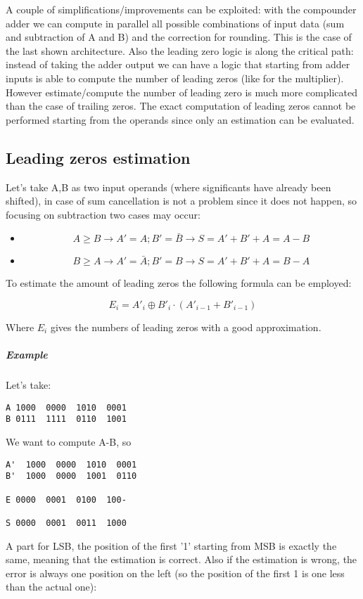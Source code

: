 A couple of simplifications/improvements can be exploited: with the compounder
adder we can compute in parallel all possible combinations of input data (sum
and subtraction of A and B) and the correction for rounding. This is the case
of the last shown architecture. Also the leading zero logic is along the
critical path: instead of taking the adder output we can have a logic that
starting from adder inputs is able to compute the number of leading zeros (like
for the multiplier). However estimate/compute the number of leading zero is
much more complicated than the case of trailing zeros. The exact computation of
leading zeros cannot be performed starting from the operands since only an
estimation can be evaluated.

\subsection{Leading zeros estimation}
Let's take A,B as two input operands (where significants have already been
shifted), in case of sum cancellation is not a problem since it does not
happen, so focusing on subtraction two cases may occur:

\begin{itemize}
  \item $$A \geq B \longrightarrow A'=A; B'=\bar{B} \longrightarrow
  S=A'+B'+A=A-B$$
  \item $$B \geq A \longrightarrow A'=\bar{A}; B'=B \longrightarrow
  S=A'+B'+A=B-A$$
\end{itemize}

To estimate the amount of leading zeros the following formula can be employed:

$$E_i = A'_i \oplus B'_i \cdot (A'_{i-1}+B'_{i-1})$$

Where $E_i$ gives the numbers of leading zeros with a good approximation.

\subparagraph{Example}
Let's take:

\begin{verbatim}
A 1000  0000  1010  0001
B 0111  1111  0110  1001
\end{verbatim}

We want to compute A-B, so
\begin{verbatim}
A'  1000  0000  1010  0001
B'  1000  0000  1001  0110

E 0000  0001  0100  100-

S 0000  0001  0011  1000
\end{verbatim}

A part for LSB, the position of the first '1' starting from MSB  is exactly the
same, meaning that the estimation is correct. Also if the estimation is wrong,
the error is always one position on the left (so the position of the first 1 is
one less than the actual one):

